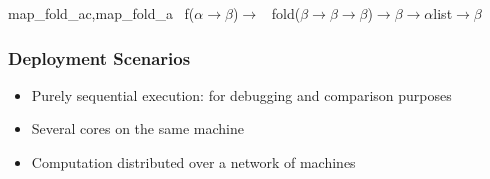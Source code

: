 \documentclass[xcolor=dvipsnames,8pt]{beamer}
\begin{document}
\begin{frame}
\medskip\noindent
{\colorbox{tmpcolor}{\begin{minipage}{\textwidth}\tt\parindent 0pt

\noindent{}\hspace*{1.22ex}map\_{}fold\_{}ac,\hspace*{1.22ex}map\_{}fold\_{}a~\linebreak
\noindent\hspace*{0.00em}f\hspace*{1.22ex}(\ensuremath{\alpha}\hspace*{1.22ex}\ensuremath{\rightarrow}\hspace*{1.22ex}\ensuremath{\beta})\hspace*{1.22ex}\ensuremath{\rightarrow}\hspace*{1.22ex}~\linebreak
\noindent\hspace*{0.00em}fold\hspace*{1.22ex}(\ensuremath{\beta}\hspace*{1.22ex}\ensuremath{\rightarrow}\hspace*{1.22ex}\ensuremath{\beta}\hspace*{1.22ex}\ensuremath{\rightarrow}\hspace*{1.22ex}\ensuremath{\beta})\hspace*{1.22ex}\ensuremath{\rightarrow}\hspace*{1.22ex}\ensuremath{\beta}\hspace*{1.22ex}\ensuremath{\rightarrow}\hspace*{1.22ex}\ensuremath{\alpha}\hspace*{1.22ex}list\hspace*{1.22ex}\ensuremath{\rightarrow}\hspace*{1.22ex}\ensuremath{\beta}
\end{minipage}}}


\medskip\noindent
\end{frame}


\begin{frame}\frametitle {Deployment Scenarios}
  \begin{itemize}
  \item Purely sequential execution: for debugging and comparison
    purposes
  \item Several cores on the same machine
  \item Computation distributed over a network of machines
  \end{itemize}
  
\end{frame}
\end{document}
